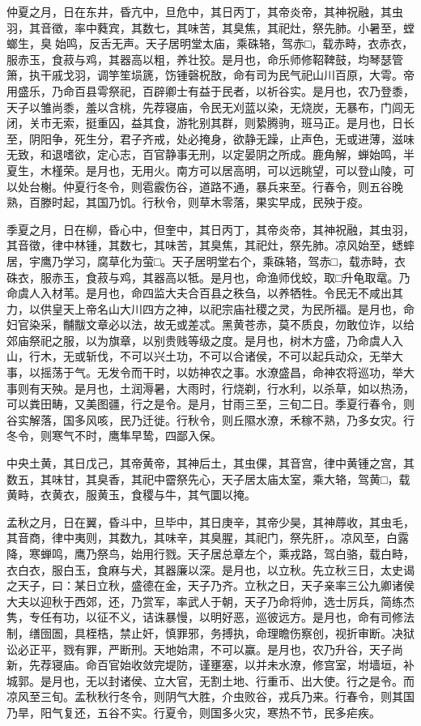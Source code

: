 \documentclass[]{article}
\begin{document}
仲夏之月，日在东井，昏亢中，旦危中，其日丙丁，其帝炎帝，其神祝融，其虫羽，其音徵，率中蕤宾，其数七，其味苦，其臭焦，其祀灶，祭先肺。小暑至，螳螂生，臭始鸣，反舌无声。天子居明堂太庙，乘硃辂，驾赤□，载赤畤，衣赤衣，服赤玉，食菽与鸡，其器高以粗，养壮狡。是月也，命乐师修鞀鞞鼓，均琴瑟管箫，执干戚戈羽，调竽笙埙篪，饬锺磬柷敔，命有司为民气祀山川百原，大雩。帝用盛乐，乃命百县雩祭祀，百辟卿士有益于民者，以祈谷实。是月也，农乃登黍，天子以雏尚黍，羞以含桃，先荐寝庙，令民无刈蓝以染，无烧炭，无暴布，门闾无闭，关市无索，挺重囚，益其食，游牝别其群，则絷腾驹，班马正。是月也，日长至，阴阳争，死生分，君子齐戒，处必掩身，欲静无躁，止声色，无或进薄，滋味无致，和退嗜欲，定心志，百官静事无刑，以定晏阴之所成。鹿角解，蝉始鸣，半夏生，木槿荣。是月也，无用火。南方可以居高明，可以远眺望，可以登山陵，可以处台榭。仲夏行冬令，则雹霰伤谷，道路不通，暴兵来至。行春令，则五谷晚熟，百滕时起，其国乃饥。行秋令，则草木零落，果实早成，民殃于疫。

季夏之月，日在柳，昏心中，但奎中，其日丙丁，其帝炎帝，其神祝融，其虫羽，其音徵，律中林锺，其数七，其味苦，其臭焦，其祀灶，祭先肺。凉风始至，蟋蟀居，宇鹰乃学习，腐草化为萤□。天子居明堂右个，乘硃辂，驾赤□，载赤畤，衣硃衣，服赤玉，食菽与鸡，其器高以牴。是月也，命渔师伐蛟，取□升龟取鼋。乃命虞人入材苇。是月也，命四监大夫合百县之秩刍，以养牺牲。令民无不咸出其力，以供皇天上帝名山大川四方之神，以祀宗庙社稷之灵，为民所福。是月也，命妇官染采，黼黻文章必以法，故无或差忒。黑黄苍赤，莫不质良，勿敢位诈，以给郊庙祭祀之服，以为旗章，以别贵贱等级之度。是月也，树木方盛，乃命虞人入山，行木，无或斩伐，不可以兴土功，不可以合诸侯，不可以起兵动众，无举大事，以摇荡于气。无发令而干时，以妨神农之事。水潦盛昌，命神农将巡功，举大事则有天殃。是月也，土润溽暑，大雨时，行烧剃，行水利，以杀草，如以热汤，可以粪田畴，又美图疆，行之是令。是月，甘雨三至，三旬二日。季夏行春令，则谷实解落，国多风咳，民乃迁徙。行秋令，则丘隰水潦，禾稼不熟，乃多女灾。行冬令，则寒气不时，鹰隼早鸷，四鄙入保。

中央土黄，其日戊己，其帝黄帝，其神后土，其虫倮，其音宫，律中黄锺之宫，其数五，其味甘，其臭香，其祀中霤祭先心，天子居太庙太室，乘大辂，驾黄□，载黄畤，衣黄衣，服黄玉，食稷与牛，其气圜以掩。

孟秋之月，日在翼，昏斗中，旦毕中，其日庚辛，其帝少昊，其神蓐收，其虫毛，其音商，律中夷则，其数九，其味辛，其臭腥，其祀门，祭先肝，。凉风至，白露降，寒蝉鸣，鹰乃祭鸟，始用行戮。天子居总章左个，乘戎路，驾白骆，载白畤，衣白衣，服白玉，食麻与犬，其器廉以深。是月也，以立秋。先立秋三日，太史谒之天子，曰：某日立秋，盛德在金，天子乃齐。立秋之日，天子亲率三公九卿诸侯大夫以迎秋于西郊，还，乃赏军，率武人于朝，天子乃命将帅，选士厉兵，简练杰隽，专任有功，以征不义，诘诛暴慢，以明好恶，巡彼远方。是月也，命有司修法制，缮囹圄，具桎梏，禁止奸，慎罪邪，务搏执，命理瞻伤察创，视折审断。决狱讼必正平，戮有罪，严断刑。天地始肃，不可以赢。是月也，农乃升谷，天子尚新，先荐寝庙。命百官始收敛完堤防，谨壅塞，以并未水潦，修宫室，坿墙垣，补城郭。是月也，无以封诸侯、立大官，无割土地、行重币、出大使。行之是令。而凉风至三旬。孟秋秋行冬令，则阴气大胜，介虫败谷，戎兵乃来。行春令，则其国乃旱，阳气复还，五谷不实。行夏令，则国多火灾，寒热不节，民多疟疾。
\end{document}
